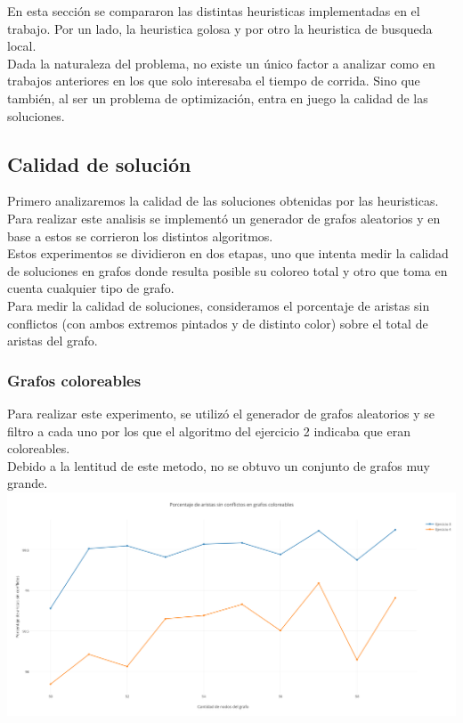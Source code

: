 En esta sección se compararon las distintas heuristicas implementadas en el trabajo. Por un lado, la heuristica golosa y por otro la heuristica de busqueda local.\\
Dada la naturaleza del problema, no existe un único factor a analizar como en trabajos anteriores en los que solo interesaba el tiempo de corrida. Sino que también, al ser un problema de optimización, entra en juego la calidad de las soluciones. \\

\subsection{Calidad de solución}
Primero analizaremos la calidad de las soluciones obtenidas por las heuristicas. Para realizar este analisis se implementó un generador de grafos aleatorios y en base a estos se corrieron los distintos algoritmos. \\
Estos experimentos se dividieron en dos etapas, uno que intenta medir la calidad de soluciones en grafos donde resulta posible su coloreo total y otro que toma en cuenta cualquier tipo de grafo.\\

Para medir la calidad de soluciones, consideramos el porcentaje de aristas sin conflictos (con ambos extremos pintados y de distinto color) sobre el total de aristas del grafo.

\subsubsection{Grafos coloreables}

Para realizar este experimento, se utilizó el generador de grafos aleatorios y se filtro a cada uno por los que el algoritmo del ejercicio 2 indicaba que eran coloreables. \\

Debido a la lentitud de este metodo, no se obtuvo un conjunto de grafos muy grande. \\

\includegraphics[scale=0.45]{./imagenes5/coloreables.png}
 	{}

